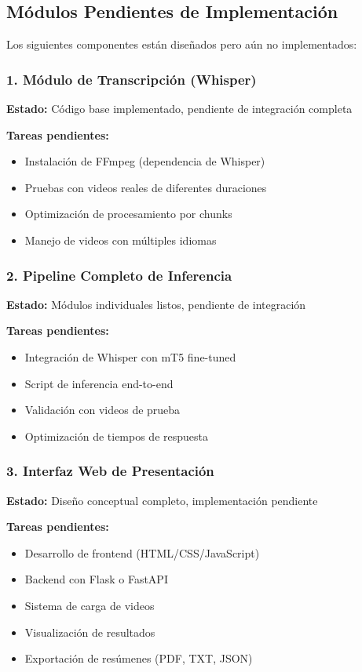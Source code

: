 \documentclass[12pt,a4paper]{article}
\begin{document}
\newpage

\subsection{Módulos Pendientes de Implementación}

Los siguientes componentes están diseñados pero aún no implementados:

\subsubsection{1. Módulo de Transcripción (Whisper)}

\textbf{Estado:} Código base implementado, pendiente de integración completa

\textbf{Tareas pendientes:}
\begin{itemize}
    \item Instalación de FFmpeg (dependencia de Whisper)
    \item Pruebas con videos reales de diferentes duraciones
    \item Optimización de procesamiento por chunks
    \item Manejo de videos con múltiples idiomas
\end{itemize}

\subsubsection{2. Pipeline Completo de Inferencia}

\textbf{Estado:} Módulos individuales listos, pendiente de integración

\textbf{Tareas pendientes:}
\begin{itemize}
    \item Integración de Whisper con mT5 fine-tuned
    \item Script de inferencia end-to-end
    \item Validación con videos de prueba
    \item Optimización de tiempos de respuesta
\end{itemize}

\subsubsection{3. Interfaz Web de Presentación}

\textbf{Estado:} Diseño conceptual completo, implementación pendiente

\textbf{Tareas pendientes:}
\begin{itemize}
    \item Desarrollo de frontend (HTML/CSS/JavaScript)
    \item Backend con Flask o FastAPI
    \item Sistema de carga de videos
    \item Visualización de resultados
    \item Exportación de resúmenes (PDF, TXT, JSON)
\end{itemize}
\end{document}
